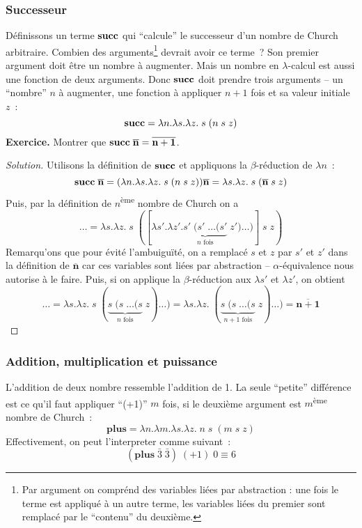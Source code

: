 \subsubsection*{Successeur}
Définissons un terme $\mathbf{succ}$ qui ``calcule'' le successeur d'un nombre de Church arbitraire.
Combien des arguments\footnote{Par argument on comprénd des variables liées par abstraction : une fois le terme est appliqué à un autre terme, les variables liées du premier sont remplacé par le ``contenu'' du deuxième.} devrait avoir ce terme~?
Son premier argument doit être un nombre à augmenter.
Mais un nombre en $\lambda$-calcul est aussi une fonction de deux arguments.
Donc $\mathbf{succ}$ doit prendre trois arguments -- un ``nombre'' $n$ à augmenter, une fonction à appliquer $n+1$ fois et sa valeur initiale $z$~:
$$\mathbf{succ} = \lambda n. \lambda s. \lambda z. \; s \; (n \; s \; z)$$
\textbf{Exercice.} Montrer que $\mathbf{succ} \; \mathbf{\overline{n}} = \mathbf{\overline{n+1}}$.
\begin{proof}[Solution]
	Utilisons la définition de $\mathbf{succ}$ et appliquons la $\beta$-réduction de $\lambda n$~:
	\[
		\mathbf{succ} \; \mathbf{\overline{n}}
		= (\lambda n. \lambda s. \lambda z. \; s \; (n \; s \; z)) \mathbf{\overline{n}}
		= \lambda s. \lambda z. \; s \; (\mathbf{\overline{n}} \; s \; z)
	\]
	Puis, par la définition de $n$\textsuperscript{ème} nombre de Church on a
	\[
		\ldots = \lambda s. \lambda z. \; s \; ([\lambda s'. \lambda z'. \underbrace{s' \; (s' \; \ldots (s'}_{n\text{ fois}} \; z') \ldots )] \; s \; z)
	\]
	Remarqu'ons que pour évité l'ambuiguïté, on a remplacé $s$ et $z$ par $s'$ et $z'$ dans la définition de $\mathbf{\overline{n}}$ car ces variables sont liées par abstraction -- $\alpha$-équivalence nous autorise à le faire.
	Puis, si on applique la $\beta$-réduction aux $\lambda s'$ et $\lambda z'$, on obtient
	\[
		\ldots 
		= \lambda s. \lambda z. \; s \; (\underbrace{s \; (s \; \ldots (s}_{n\text{ fois}} \; z) \ldots )
		= \lambda s. \lambda z. \; (\underbrace{s \; (s \; \ldots (s}_{n+1\text{ fois}} \; z) \ldots)
		= \mathbf{\overline{n+1}}
	\]
\end{proof}

\subsubsection*{Addition, multiplication et puissance}
L'addition de deux nombre ressemble l'addition de 1.
La seule ``petite'' différence est ce qu'il faut appliquer ``(+1)'' $m$ fois, si le deuxième argument est $m$\textsuperscript{ème} nombre de Church~:
$$\mathbf{plus} = \lambda n. \lambda m. \lambda s. \lambda z. \; n \; s \; (m \; s \; z)$$
Effectivement, on peut l'interpreter comme suivant~:
$$(\mathbf{plus} \; \bar{3} \; \bar{3}) \; (+1) \; 0 \equiv 6$$

